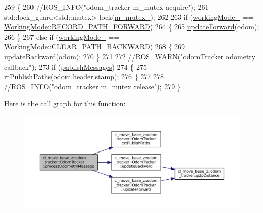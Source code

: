 \begin{DoxyCode}
259 \{
260     \textcolor{comment}{//ROS\_INFO("odom\_tracker m\_mutex acquire");}
261     std::lock\_guard<std::mutex> lock(\hyperlink{classcl__move__base__z_1_1odom__tracker_1_1OdomTracker_aa371639e1eee269273dec8d3ab9dba0f}{m\_mutex\_});
262 
263     \textcolor{keywordflow}{if} (\hyperlink{classcl__move__base__z_1_1odom__tracker_1_1OdomTracker_a5ae598c85c4469f4c0e984480575c42b}{workingMode\_} == \hyperlink{namespacecl__move__base__z_1_1odom__tracker_ac46b05813b2791604f6cd0a39ace3ef8a989d06a586bcf9520889228da7faa643}{WorkingMode::RECORD\_PATH\_FORWARD})
264     \{
265         \hyperlink{classcl__move__base__z_1_1odom__tracker_1_1OdomTracker_aa63ebddd9f6e42b0330738af82b60f99}{updateForward}(odom);
266     \}
267     \textcolor{keywordflow}{else} \textcolor{keywordflow}{if} (\hyperlink{classcl__move__base__z_1_1odom__tracker_1_1OdomTracker_a5ae598c85c4469f4c0e984480575c42b}{workingMode\_} == \hyperlink{namespacecl__move__base__z_1_1odom__tracker_ac46b05813b2791604f6cd0a39ace3ef8a0cf8f27617189e35619df3c18bda6274}{WorkingMode::CLEAR\_PATH\_BACKWARD})
268     \{
269         \hyperlink{classcl__move__base__z_1_1odom__tracker_1_1OdomTracker_a35c8d8d9ae82244ef351ba0a6a4a7cfd}{updateBackward}(odom);
270     \}
271 
272     \textcolor{comment}{//ROS\_WARN("odomTracker odometry callback");}
273     \textcolor{keywordflow}{if} (\hyperlink{classcl__move__base__z_1_1odom__tracker_1_1OdomTracker_a4f253d45ab5750dee3c2f18dd5599725}{publishMessages})
274     \{
275         \hyperlink{classcl__move__base__z_1_1odom__tracker_1_1OdomTracker_a8f728f85d1f3f49f4b94e37052a59d6d}{rtPublishPaths}(odom.header.stamp);
276     \}
277 
278     \textcolor{comment}{//ROS\_INFO("odom\_tracker m\_mutex release");}
279 \}
\end{DoxyCode}


Here is the call graph for this function\+:
\nopagebreak
\begin{figure}[H]
\begin{center}
\leavevmode
\includegraphics[width=350pt]{classcl__move__base__z_1_1odom__tracker_1_1OdomTracker_a12c5a839cfde2e8f2f55a5e0c9647b18_cgraph}
\end{center}
\end{figure}




